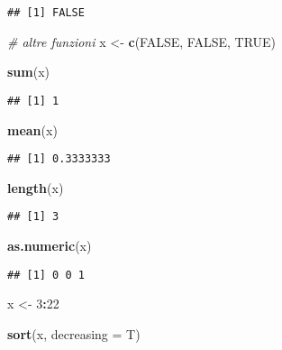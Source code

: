 \documentclass[
]{article}
\newenvironment{Shaded}{\begin{snugshade}}{\end{snugshade}}
\newcommand{\AttributeTok}[1]{\textcolor[rgb]{0.13,0.29,0.53}{#1}}
\newcommand{\CommentTok}[1]{\textcolor[rgb]{0.56,0.35,0.01}{\textit{#1}}}
\newcommand{\ConstantTok}[1]{\textcolor[rgb]{0.56,0.35,0.01}{#1}}
\newcommand{\DecValTok}[1]{\textcolor[rgb]{0.00,0.00,0.81}{#1}}
\newcommand{\FunctionTok}[1]{\textcolor[rgb]{0.13,0.29,0.53}{\textbf{#1}}}
\newcommand{\NormalTok}[1]{#1}
\newcommand{\OtherTok}[1]{\textcolor[rgb]{0.56,0.35,0.01}{#1}}
\newcommand{\SpecialCharTok}[1]{\textcolor[rgb]{0.81,0.36,0.00}{\textbf{#1}}}
\begin{document}
\begin{verbatim}
## [1] FALSE
\end{verbatim}

\begin{Shaded}
\begin{Highlighting}[]
\CommentTok{\# altre funzioni}
\NormalTok{x }\OtherTok{\textless{}{-}} \FunctionTok{c}\NormalTok{(}\ConstantTok{FALSE}\NormalTok{, }\ConstantTok{FALSE}\NormalTok{, }\ConstantTok{TRUE}\NormalTok{)}

\FunctionTok{sum}\NormalTok{(x)}
\end{Highlighting}
\end{Shaded}

\begin{verbatim}
## [1] 1
\end{verbatim}

\begin{Shaded}
\begin{Highlighting}[]
\FunctionTok{mean}\NormalTok{(x)}
\end{Highlighting}
\end{Shaded}

\begin{verbatim}
## [1] 0.3333333
\end{verbatim}

\begin{Shaded}
\begin{Highlighting}[]
\FunctionTok{length}\NormalTok{(x)}
\end{Highlighting}
\end{Shaded}

\begin{verbatim}
## [1] 3
\end{verbatim}

\begin{Shaded}
\begin{Highlighting}[]
\FunctionTok{as.numeric}\NormalTok{(x)}
\end{Highlighting}
\end{Shaded}

\begin{verbatim}
## [1] 0 0 1
\end{verbatim}

\begin{Shaded}
\begin{Highlighting}[]
\NormalTok{x }\OtherTok{\textless{}{-}} \DecValTok{3}\SpecialCharTok{:}\DecValTok{22}

\FunctionTok{sort}\NormalTok{(x, }\AttributeTok{decreasing =}\NormalTok{ T)}
\end{Highlighting}
\end{Shaded}
\end{document}
